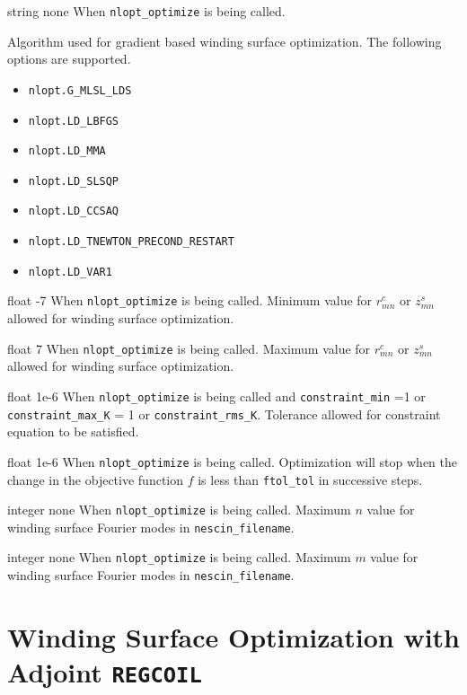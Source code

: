 \myhrule

{string}
{none}
{When \texttt{nlopt\_optimize} is being called. }
{Algorithm used for gradient based winding surface optimization. The following options are supported.
\begin{itemize}
\item \texttt{nlopt.G\_MLSL\_LDS}
\item \texttt{nlopt.LD\_LBFGS}
\item \texttt{nlopt.LD\_MMA}
\item \texttt{nlopt.LD\_SLSQP} 
\item \texttt{nlopt.LD\_CCSAQ}
\item \texttt{nlopt.LD\_TNEWTON\_PRECOND\_RESTART}
\item \texttt{nlopt.LD\_VAR1}
\end{itemize}
}

\myhrule

{float}
{-7}
{When \texttt{nlopt\_optimize} is being called. }
{Minimum value for $r_{mn}^c$ or $z_{mn}^s$ allowed for winding surface optimization.}

\myhrule

{float}
{7}
{When \texttt{nlopt\_optimize} is being called. }
{Maximum value for $r_{mn}^c$ or $z_{mn}^s$ allowed for winding surface optimization.}

\myhrule

{float}
{1e-6}
{When \texttt{nlopt\_optimize} is being called and \texttt{constraint\_min} =1 or \texttt{constraint\_max\_K} = 1 or \texttt{constraint\_rms\_K}.}
{Tolerance allowed for constraint equation to be satisfied.}

\myhrule

{float}
{1e-6}
{When \texttt{nlopt\_optimize} is being called.}
{Optimization will stop when the change in the objective function $f$ is less than \texttt{ftol\_tol} in successive steps.}

\myhrule

{integer}
{none}
{When \texttt{nlopt\_optimize} is being called.}
{Maximum $n$ value for winding surface Fourier modes in \texttt{nescin\_filename}.}

\myhrule

{integer}
{none}
{When \texttt{nlopt\_optimize} is being called.}
{Maximum $m$ value for winding surface Fourier modes in \texttt{nescin\_filename}.}

\chapter{Winding Surface Optimization with Adjoint \texttt{REGCOIL}}
\label{ch:adjoint}

